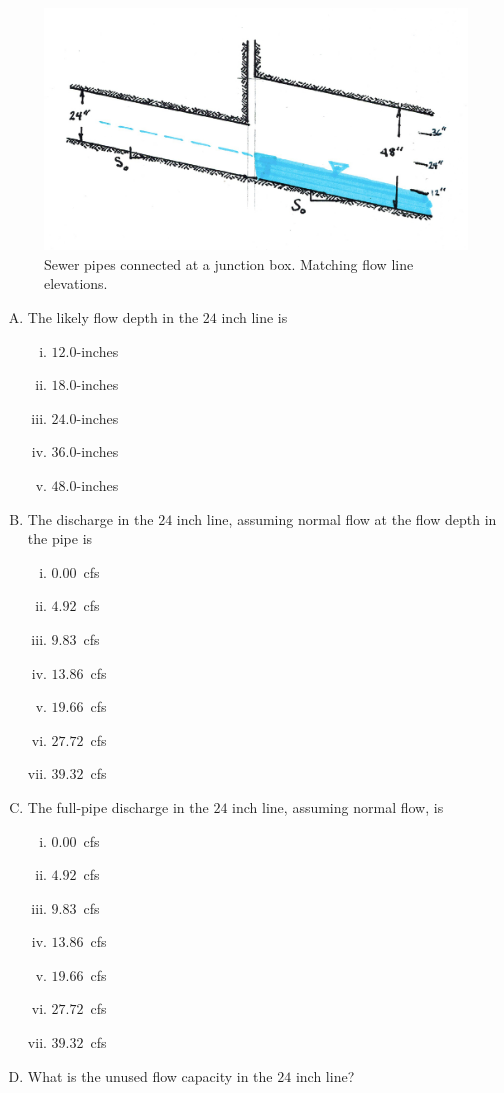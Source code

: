 \documentclass[11pt]{article}
\begin{document}
\begin{enumerate}
\begin{figure}[h!] %
\centering
   \includegraphics[width=4.5in]{SewerPipeMatchFlowline.jpg}
   \caption{Sewer pipes connected at a junction box.  Matching flow line elevations.}
   \label{fig:SewerPipeMatchFlowline} 
\end{figure}

\begin{enumerate}[(A)]
\item The likely flow depth in the $24$ inch line is
\begin{enumerate} [i)]
\item $12.0$-inches 
\item $18.0$-inches 
\item $24.0$-inches 
\item $36.0$-inches
\item $48.0$-inches
\end{enumerate} 
\item The discharge in the $24$ inch line, assuming normal flow at the flow depth in the pipe is 
\begin{enumerate} [i)]
\item $0.00$~cfs
\item $4.92$~cfs
\item $9.83$~cfs
\item $13.86$~cfs 
\item $19.66$~cfs
\item $27.72$~cfs
\item $39.32$~cfs
\end{enumerate} 
\item The full-pipe discharge in the $24$ inch line, assuming normal flow, is
\begin{enumerate} [i)]
\item $0.00$~cfs
\item $4.92$~cfs
\item $9.83$~cfs
\item $13.86$~cfs 
\item $19.66$~cfs
\item $27.72$~cfs
\item $39.32$~cfs
\end{enumerate} 
\item What is the unused flow capacity in the $24$ inch line? ~\\ ~\\
\end{enumerate}


\end{enumerate}
\end{document}
